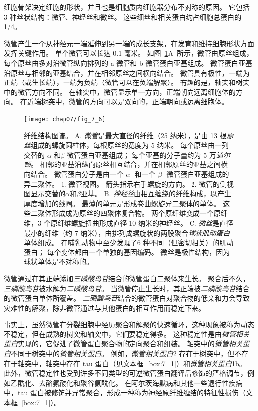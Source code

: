 细胞骨架决定细胞的形状，并且也是细胞质内细胞器分布不对称的原因。
它包括 3 种丝状结构：微管、神经丝和微丝。
这些细丝和相关蛋白约占细胞总蛋白的 1/4。


微管产生一个从神经元一端延伸到另一端的成长支架，在发育和维持细胞形状方面发挥关键作用。
单个微管可以长达 0.1 毫米。
如图~\ref{fig:7_6}A~所示，微管由原丝组成，每个原丝由多对沿微管纵向排列的 a-微管和 b-微管蛋白亚基组成。 
微管蛋白亚基沿原丝与相邻的亚基结合，并在相邻原丝之间横向结合。
微管具有极性，一端为正端（或生长端），一端为负端（微管可以在负端解聚）。
有趣的是，轴突和树突中的微管方向不同。
在轴突中，微管显示单一方向，正端朝向远离细胞体的方向。
在近端树突中，微管的方向可以是双向的，正端朝向或远离细胞体。


\begin{figure}[htbp]
	\centering
	\texttt{[image: chap07/fig\_7\_6]}
	\caption{纤维结构图谱。
		A. \textit{微管}是最大直径的纤维（25 纳米），是由 13 根\textit{原丝}组成的螺旋圆柱体，每根原丝的宽度为 5 纳米。
		每个原丝由一列交替的 $\alpha$-和$\beta$-微管蛋白亚基组成；
		每个亚基的分子量约为 5 万\textit{道尔顿}。
		相邻的亚基沿纵向原丝相互结合，并在相邻原丝的亚基之间横向结合。
		微管蛋白分子是由一个 $\alpha$- 和一个 $\beta$- 微管蛋白亚基组成的异二聚体。
		1. 微管视图。
		箭头指示右手螺旋的方向。
		2. 微管的侧视图显示交替的$\alpha$和$\beta$亚基。
		B. \textit{神经丝}由相互缠绕的纤维构成，以产生厚度增加的线圈。
		最薄的单元是形成卷曲螺旋异二聚体的单体。
		这些二聚体形成成为原丝的四聚体复合物。
		两个原纤维变成一个原纤维，3 个原纤维螺旋扭曲形成直径 10 纳米的神经丝\cite{bershadsky2012cytoskeleton}。
		C. \textit{微丝}是直径最小的纤维（约 7 纳米），由排列成螺旋状的两股聚合\textit{球状肌动蛋白}单体组成。
		在哺乳动物中至少发现了6 种不同（但密切相关）的肌动蛋白；
		每个变体都由一个单独的基因编码。
		微丝是极性结构，因为球状单体是不对称的。}
	\label{fig:7_6}
\end{figure}


微管通过在其正端添加\textit{三磷酸鸟苷}结合的微管蛋白二聚体来生长。
聚合后不久，\textit{三磷酸鸟苷}被水解为\textit{二磷酸鸟苷}。
当微管停止生长时，其正端被\textit{二磷酸鸟苷}结合的微管蛋白单体所覆盖。
\textit{二磷酸鸟苷}结合的微管蛋白对聚合物的低亲和力会导致灾难性的解聚，除非微管通过与其他蛋白的相互作用而稳定下来。


事实上，虽然微管在分裂细胞中经历聚合和解聚的快速循环，这种现象被称为动态不稳定，但在成熟的树突和轴突中，它们要稳定得多。
这种稳定性是由\textit{微管相关蛋白}实现的，它促进了微管蛋白聚合物的定向聚合和组装。
轴突中的\textit{微管相关蛋白}不同于树突中的\textit{微管相关蛋白}。
例如，\textit{微管相关蛋白}2 存在于树突中，但不存在于轴突中，轴突中存在 tau 蛋白（见文本框~\ref{box:7_1}）和\textit{微管相关蛋白}1b。
此外，微管稳定性也受到许多不同类型的可逆微管蛋白翻译后修饰的严格调节，例如乙酰化、去酪氨酸化和聚谷氨酰化。
在阿尔茨海默病和其他一些退行性疾病中，tau 蛋白被修饰并异常聚合，形成一种称为神经原纤维缠结的特征性损伤（文本框~\ref{box:7_1}）。


